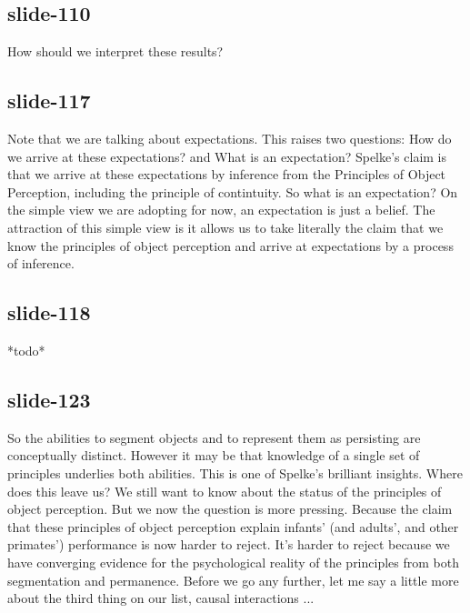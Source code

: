 \documentclass[12pt,\papersize]{extarticle}
\begin{document}
 
\subsection{slide-110}
How should we interpret these results?
 
 
\subsection{slide-117}
Note that we are talking about expectations.
This raises two questions: How do we arrive at these expectations? and What is an expectation?
Spelke's claim is that we arrive at these expectations by inference from the Principles of Object Perception, including the principle of contintuity.
So what is an expectation?
On the simple view we are adopting for now, an expectation is just a belief.
The attraction of this simple view is it allows us to take literally the claim that we know the principles of object perception and arrive at expectations by a process of inference.
 
 
\subsection{slide-118}
*todo*
 
 
\subsection{slide-123}
So the abilities to segment objects and to represent them as persisting are conceptually distinct.
However it may be that knowledge of a single set of principles underlies both abilities.
This is one of Spelke's brilliant insights.
Where does this leave us?
We still want to know about the status of the principles of object perception.
But we now the question is more pressing.
Because the claim that these principles of object perception explain infants' (and adults', and other primates') performance is now harder to reject.
It's harder to reject because we have converging evidence for the psychological reality of the principles from both segmentation and permanence.
Before we go any further, let me say a little more about the third thing on our list, causal interactions ...
 
 
\end{document}
